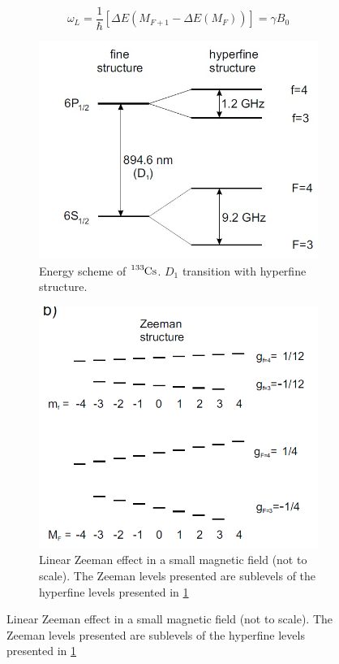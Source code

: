 \documentclass[a4paper,kul]{kulakarticle} %
\begin{document}
\begin{equation}
	\label{eq: Larmor frequency}
	\omega_{L} = \frac{1}{\hbar}\left[\Delta E(M_{F+1} - \Delta E(M_{F}))\right] = \gamma B_{0}
\end{equation}

\begin{figure}[h!]
	\centering
	\begin{subfigure}{.5\textwidth}
		\centering
		\includegraphics[width=.7\linewidth]{hyperfine}
		\caption{Energy scheme of $\ce{^{133}Cs}$. $D_{1}$ transition with hyperfine structure.}
		\label{fig:hyperfine}
	\end{subfigure}%
	\begin{subfigure}{.5\textwidth}
		\centering
		\includegraphics[width=.7\linewidth]{zeeman}
		\caption{Linear Zeeman effect in a small magnetic field (not to scale). The Zeeman levels presented are sublevels of the hyperfine levels presented in \ref{fig:hyperfine}  }
		\label{fig:zeeman}
	\end{subfigure}
\end{figure}
\end{document}
